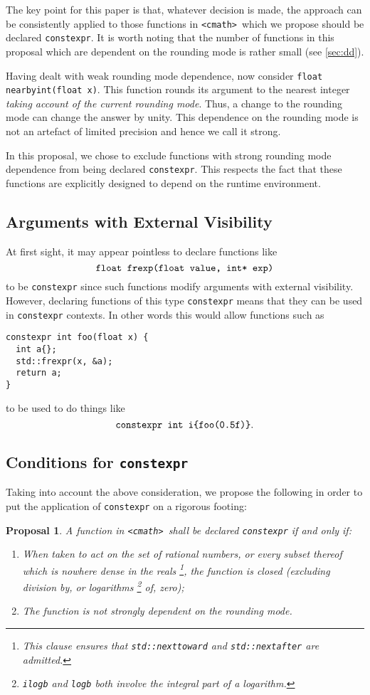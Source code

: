 \documentclass[prd,twocolumn,amsmath,amssymb,nofootinbib,eqsecnum]{revtex4-1}
\newcommand{\constexpr}{\code{constexpr}\xspace}
\newcommand{\code}[1]{{\tt #1}}
\newcommand{\header}[1]{{\tt <#1>}}
\newcommand{\cmath}{\header{cmath}}
\newtheorem*{proposal*}{Proposal}
\begin{document}
The key point for this paper is that, whatever decision is made, the approach can be consistently applied to those functions in \cmath\ which we propose should be declared \constexpr. It is worth noting that the number of functions in this proposal which are dependent on the rounding mode is rather small (see \ref{sec:dd}).

Having dealt with weak rounding mode dependence, now consider \code{float nearbyint(float x)}. This function rounds its argument to the nearest integer \emph{taking account of the current rounding mode}. Thus, a change to the rounding mode can change the answer by unity. This dependence on the rounding mode is not an artefact of limited precision and hence we call it strong.

In this proposal, we chose to exclude functions with strong rounding mode dependence from being declared \constexpr. This respects the fact that these functions are explicitly designed to depend on the runtime environment.

\subsection{Arguments with External Visibility}
\label{sec:external}

At first sight, it may appear pointless to declare functions like
\[
	\mbox{\code{float frexp(float value, int* exp)}}
\]
to be \constexpr since such functions modify arguments with external visibility.
However, declaring functions of this type \constexpr means that they can be used
in \constexpr contexts. In other words this would allow functions such as
\begin{Verbatim}
constexpr int foo(float x) {
  int a{};
  std::frexpr(x, &a);
  return a;
}
\end{Verbatim}	
to be used to do things like
\[
	\mbox{\code{constexpr int i\{foo(0.5f)\}}}.
\]


\subsection{Conditions for \constexpr}

Taking into account the above consideration, we propose the following in order to put
the application of \constexpr on a rigorous footing:
\begin{proposal*}
	A function in \cmath\ shall be declared \constexpr if and only if:
	\begin{enumerate}
		\item When taken to act on the set of rational numbers, or every subset thereof which is 	
		nowhere dense in the reals%
		\footnote{This clause ensures that \code{std::nexttoward} and \code{std::nextafter} are 
		admitted.},
		the function is closed (excluding division by, or logarithms%
		\footnote{\code{ilogb} and \code{logb} both involve the integral part of a logarithm.}
		of, zero);
		
		\item The function is not strongly dependent on the rounding mode.
	\end{enumerate}
\end{proposal*}
\end{document}
